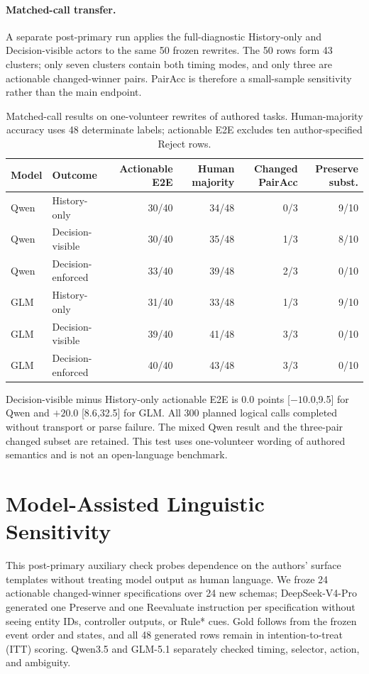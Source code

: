 \documentclass[10pt]{article}
\begin{document}
\paragraph{Matched-call transfer.}
A separate post-primary run applies the full-diagnostic History-only and Decision-visible actors to
the same 50 frozen rewrites. The 50 rows form 43 clusters; only seven clusters contain both timing
modes, and only three are actionable changed-winner pairs. PairAcc is therefore a small-sample
sensitivity rather than the main endpoint.
\begin{table}[H]
\centering
\small
\begin{tabular}{llrrrr}
\toprule
Model & Outcome & Actionable E2E & Human majority & Changed PairAcc & Preserve subst. \\
\midrule
Qwen & History-only & 30/40 & 34/48 & 0/3 & 9/10 \\
Qwen & Decision-visible & 30/40 & 35/48 & 1/3 & 8/10 \\
Qwen & Decision-enforced & 33/40 & 39/48 & 2/3 & 0/10 \\
GLM & History-only & 31/40 & 33/48 & 1/3 & 9/10 \\
GLM & Decision-visible & 39/40 & 41/48 & 3/3 & 0/10 \\
GLM & Decision-enforced & 40/40 & 43/48 & 3/3 & 0/10 \\
\bottomrule
\end{tabular}
\caption{Matched-call results on one-volunteer rewrites of authored tasks. Human-majority
accuracy uses 48 determinate labels; actionable E2E excludes ten author-specified Reject rows.}
\label{tab:supp-human-rewrite-matched}
\end{table}
Decision-visible minus History-only actionable E2E is 0.0 points [$-10.0$,9.5] for Qwen and
$+20.0$ [8.6,32.5] for GLM. All 300 planned logical calls completed without transport or
parse failure. The mixed Qwen result and the three-pair changed subset are retained. This test uses
one-volunteer wording of authored semantics and is not an open-language benchmark.

\section{Model-Assisted Linguistic Sensitivity}
This post-primary auxiliary check probes dependence on the authors' surface templates without
treating model output as human language. We froze 24 actionable changed-winner specifications over
24 new schemas; DeepSeek-V4-Pro generated one Preserve and one Reevaluate instruction per
specification without seeing entity IDs, controller outputs, or Rule* cues. Gold follows from the
frozen event order and states, and all 48 generated rows remain in intention-to-treat (ITT)
scoring. Qwen3.5 and GLM-5.1 separately checked timing, selector, action, and ambiguity.
\end{document}
